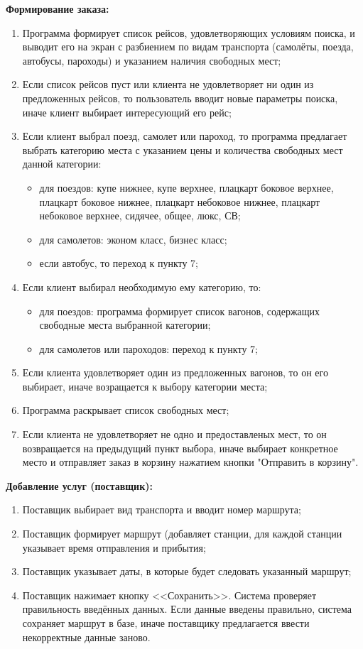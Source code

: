 {\bf Формирование заказа:}
\begin{enumerate}
  \item{Программа формирует список рейсов, удовлетворяющих условиям поиска, и выводит его на экран с разбиением по видам транспорта (самолёты, поезда, автобусы, пароходы) и указанием наличия свободных мест;}
  \item{Если список рейсов пуст или клиента не удовлетворяет ни один из предложенных рейсов, то пользователь вводит новые параметры поиска, иначе клиент выбирает интересующий его рейс;}
  \item{Если клиент выбрал поезд, самолет или пароход, то программа предлагает выбрать категорию места с указанием цены и количества свободных мест данной категории:}
  \begin{itemize} 
    \item{для поездов: купе нижнее, купе верхнее, плацкарт боковое верхнее, плацкарт боковое нижнее, плацкарт небоковое 		нижнее, плацкарт небоковое верхнее, сидячее, общее, люкс, СВ;}
    \item{для самолетов: эконом класс, бизнес класс;}
    \item{если автобус, то переход к пункту 7;}
  \end{itemize}
  \item{Если клиент выбирал необходимую ему категорию, то:}
\begin{itemize} 
    \item{для поездов: программа формирует список вагонов, содержащих свободные места выбранной категории;}
    \item{для самолетов или пароходов: переход к пункту 7;}
\end{itemize}
  \item{Если клиента удовлетворяет один из предложенных вагонов, то он его выбирает, иначе возращается к выбору категории места;}
  \item{Программа  раскрывает список свободных мест;}
  \item{Если клиента не удовлетворяет не одно и предоставленых мест, то он возвращается на предыдущий пункт выбора, иначе выбирает конкретное место и отправляет заказ в корзину нажатием кнопки "Отправить в корзину".}
\end{enumerate}


{\bf Добавление услуг (поставщик):}
\begin{enumerate}
  \item{Поставщик выбирает вид транспорта и вводит номер маршрута;}
  \item{Поставщик формирует маршрут (добавляет станции, для каждой станции указывает время отправления и прибытия;}
  \item{Поставщик указывает даты, в которые будет следовать указанный маршрут;}
  \item{Поставщик нажимает кнопку <<Сохранить>>. Система проверяет правильность введённых данных. Если данные введены правильно, система сохраняет маршрут в базе, иначе поставщику предлагается ввести некорректные данные заново.}
\end{enumerate}


